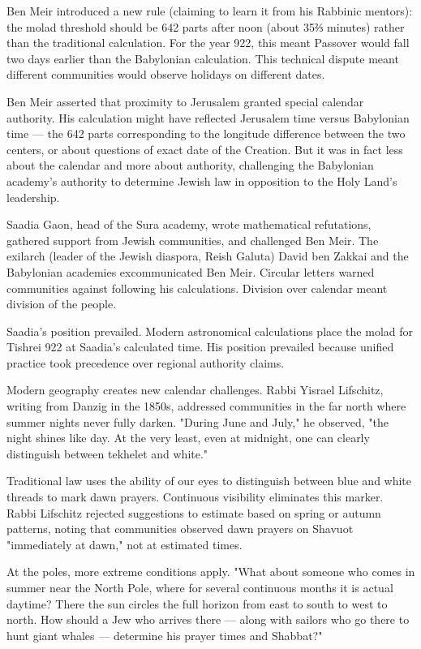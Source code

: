 Ben Meir introduced a new rule (claiming to learn it from his Rabbinic mentors): the molad threshold should be 642 parts after noon (about 35⅔ minutes) rather than the traditional calculation. For the year 922, this meant Passover would fall two days earlier than the Babylonian calculation. This technical dispute meant different communities would observe holidays on different dates.

Ben Meir asserted that proximity to Jerusalem granted special calendar authority. His calculation might have reflected Jerusalem time versus Babylonian time — the 642 parts corresponding to the longitude difference between the two centers, or about questions of exact date of the Creation. But it was in fact less about the calendar and more about authority, challenging the Babylonian academy's authority to determine Jewish law in opposition to the Holy Land's leadership.

Saadia Gaon, head of the Sura academy, wrote mathematical refutations, gathered support from Jewish communities, and challenged Ben Meir. The exilarch (leader of the Jewish diaspora, Reish Galuta) David ben Zakkai and the Babylonian academies excommunicated Ben Meir. Circular letters warned communities against following his calculations. Division over calendar meant division of the people.

Saadia's position prevailed. Modern astronomical calculations place the molad for Tishrei 922 at Saadia's calculated time. His position prevailed because unified practice took precedence over regional authority claims.

Modern geography creates new calendar challenges. Rabbi Yisrael Lifschitz, writing from Danzig in the 1850s, addressed communities in the far north where summer nights never fully darken. "During June and July," he observed, "the night shines like day. At the very least, even at midnight, one can clearly distinguish between tekhelet and white." 

Traditional law uses the ability of our eyes to distinguish between blue and white threads to mark dawn prayers. Continuous visibility eliminates this marker. Rabbi Lifschitz rejected suggestions to estimate based on spring or autumn patterns, noting that communities observed dawn prayers on Shavuot "immediately at dawn," not at estimated times.

At the poles, more extreme conditions apply. "What about someone who comes in summer near the North Pole, where for several continuous months it is actual daytime? There the sun circles the full horizon from east to south to west to north. How should a Jew who arrives there — along with sailors who go there to hunt giant whales — determine his prayer times and Shabbat?"

